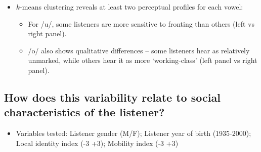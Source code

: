 \documentclass[a0,final]{a0poster}
\begin{document}
\begin{multicols}{4}
\begin{itemize}
\item{$k$-means clustering reveals at least two perceptual profiles for each vowel:\begin{itemize}\item{For /u/, some listeners are more sensitive to fronting than others (left vs right panel).}\item{/o/ also shows qualitative differences -- some listeners hear \textipa{[\o:]} as relatively unmarked, while others hear it as more `working-class' (left panel vs right panel).}\end{itemize}}
\end{itemize}
\columnbreak
\subsection*{How does this variability relate to social characteristics of the listener?}
\begin{itemize}
\item{Variables tested: Listener gender (M/F); Listener year of birth (1935-2000); Local identity index (-3 +3); Mobility index (-3 +3)}
\end{itemize}
\vspace*{-1.5cm}

\end{multicols}
\end{document}
